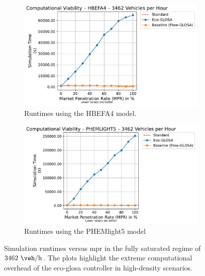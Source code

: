 \begin{figure}[htbp]
  \centering
  \begin{subfigure}[b]{0.98\textwidth}
    \includegraphics[width=\textwidth]{data/img/ComputationalViability/ComputationalViability_HBEFA4_Cars3462.pdf}
    \caption{Runtimes using the HBEFA4 model.}
    \label{fig:Comp_3462_HBEFA4}
  \end{subfigure}
  \begin{subfigure}[b]{0.98\textwidth}
    \includegraphics[width=\textwidth]{data/img/ComputationalViability/ComputationalViability_PHEMLIGHT5_Cars3462.pdf}
    \caption{Runtimes using the PHEMlight5 model}
    \label{fig:Comp_3462_PHEM}
  \end{subfigure}
  \caption[Computational Cost in Saturated Conditions]{Simulation runtimes versus \ac{mpr} in the fully saturated regime of $3462~\unit{\veh\per\hour}$. The plots highlight the extreme computational overhead of the \ac{eco-glosa} controller in high-density scenarios.}
  \label{fig:Comp_3462}
\end{figure}

